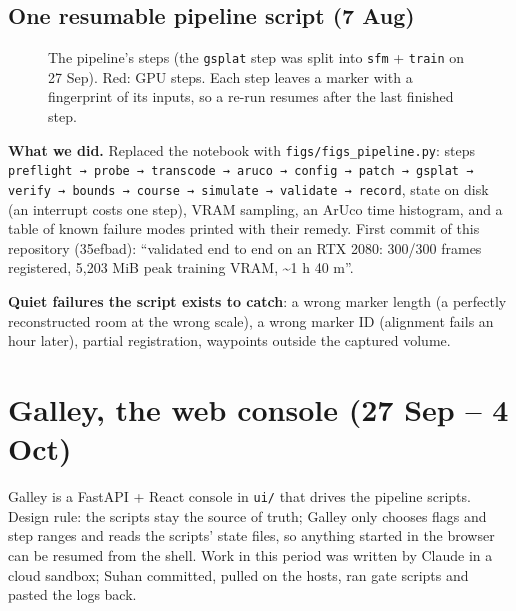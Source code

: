 \documentclass[11pt,a4paper]{article}
\newcommand{\code}[1]{\texttt{#1}}
\begin{document}
\subsection{One resumable pipeline script (7 Aug)}
\begin{figure}[ht]
\centering
{}
\caption{The pipeline's steps (the \code{gsplat} step was split into \code{sfm} + \code{train} on 27 Sep). Red: GPU
steps. Each step leaves a marker with a fingerprint of its inputs, so a re-run resumes after the last finished step.}
\end{figure}

\textbf{What we did.} Replaced the notebook with \code{figs/\allowbreak{}figs\_\allowbreak{}pipeline.py}: steps \code{preflight → probe → transcode → aruco → config → patch → gsplat → verify → bounds → course → simulate → validate → record}, state on disk (an interrupt costs one step), VRAM sampling, an ArUco time histogram, and a table of known failure modes printed with their remedy. First commit of this repository (35efbad): ``validated end to end on an RTX 2080: 300/300 frames registered, 5,203 MiB peak training VRAM, \textasciitilde{}1 h 40 m''.

\textbf{Quiet failures the script exists to catch}: a wrong marker length (a perfectly reconstructed room at the wrong scale), a wrong marker ID (alignment fails an hour later), partial registration, waypoints outside the captured volume.

\section{Galley, the web console (27 Sep – 4 Oct)}
Galley is a FastAPI + React console in \code{ui/\allowbreak{}} that drives the pipeline scripts. Design rule: the scripts stay the source of truth; Galley only chooses flags and step ranges and reads the scripts' state files, so anything started in the browser can be resumed from the shell. Work in this period was written by Claude in a cloud sandbox; Suhan committed, pulled on the hosts, ran gate scripts and pasted the logs back.
\end{document}
